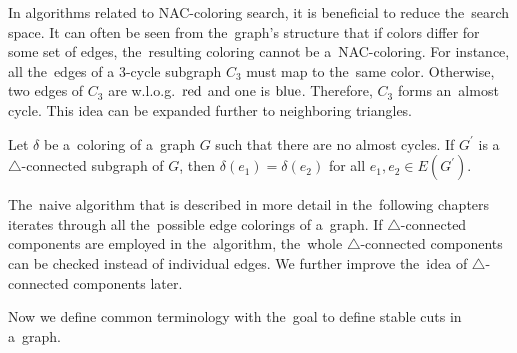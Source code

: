 In algorithms related to NAC-coloring search, it is beneficial
to reduce the~search space.
It can often be seen from the~graph's structure
that if colors differ for some set of edges,
the~resulting coloring cannot be a~NAC-coloring.
%
For instance, all the~edges of a 3-cycle subgraph \( C_3 \) must map to the~same color.
Otherwise, two edges of \( C_3 \) are w.l.o.g.\ \( \text{red} \) and one is \( \text{blue} \).
Therefore, \( C_3 \) forms an~almost cycle.
This idea can be expanded further to neighboring triangles.
%
%
\begin{lemma}
	Let \( \delta \) be a~coloring of a~graph \( G \) such that there are
	no almost cycles. If \( G^\prime \) is
	a~\( \triangle \)-connected subgraph of \( G \),
	then \( \delta(e_1) = \delta(e_2) \) for all \( e_1, e_2 \in E(G^\prime) \).
\end{lemma}
%
The~naive algorithm that is described in more detail in the~following chapters
iterates through all the~possible edge colorings of a~graph.
If \( \triangle \)-connected components are employed in the~algorithm,
the~whole \( \triangle \)-connected components can be checked instead of individual edges.
We further improve the~idea of \( \triangle \)-connected components later.

Now we define common terminology with the~goal to define stable cuts in a~graph.

